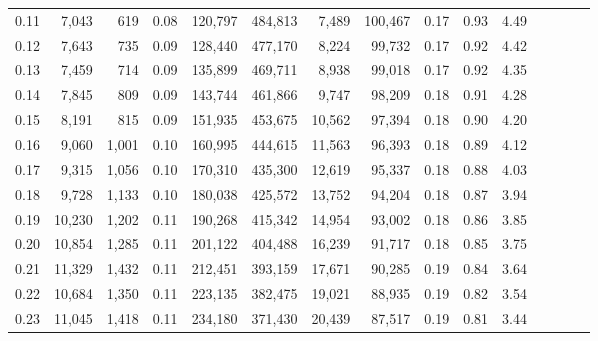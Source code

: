 \begin{tabular}{rrrcrrrrrrrrrrr}
0.11 &   7,043 &    619 &                                       0.08 &  120,797 &  484,813 &    7,489 &  100,467 &  0.17 &  0.93 &                         4.49 \\
0.12 &   7,643 &    735 &                                       0.09 &  128,440 &  477,170 &    8,224 &   99,732 &  0.17 &  0.92 &                         4.42 \\
0.13 &   7,459 &    714 &                                       0.09 &  135,899 &  469,711 &    8,938 &   99,018 &  0.17 &  0.92 &                         4.35 \\
0.14 &   7,845 &    809 &                                       0.09 &  143,744 &  461,866 &    9,747 &   98,209 &  0.18 &  0.91 &                         4.28 \\
0.15 &   8,191 &    815 &                                       0.09 &  151,935 &  453,675 &   10,562 &   97,394 &  0.18 &  0.90 &                         4.20 \\
0.16 &   9,060 &  1,001 &                                       0.10 &  160,995 &  444,615 &   11,563 &   96,393 &  0.18 &  0.89 &                         4.12 \\
0.17 &   9,315 &  1,056 &                                       0.10 &  170,310 &  435,300 &   12,619 &   95,337 &  0.18 &  0.88 &                         4.03 \\
0.18 &   9,728 &  1,133 &                                       0.10 &  180,038 &  425,572 &   13,752 &   94,204 &  0.18 &  0.87 &                         3.94 \\
0.19 &  10,230 &  1,202 &                                       0.11 &  190,268 &  415,342 &   14,954 &   93,002 &  0.18 &  0.86 &                         3.85 \\
0.20 &  10,854 &  1,285 &                                       0.11 &  201,122 &  404,488 &   16,239 &   91,717 &  0.18 &  0.85 &                         3.75 \\
0.21 &  11,329 &  1,432 &                                       0.11 &  212,451 &  393,159 &   17,671 &   90,285 &  0.19 &  0.84 &                         3.64 \\
0.22 &  10,684 &  1,350 &                                       0.11 &  223,135 &  382,475 &   19,021 &   88,935 &  0.19 &  0.82 &                         3.54 \\
0.23 &  11,045 &  1,418 &                                       0.11 &  234,180 &  371,430 &   20,439 &   87,517 &  0.19 &  0.81 &                         3.44 \\

\end{tabular}
